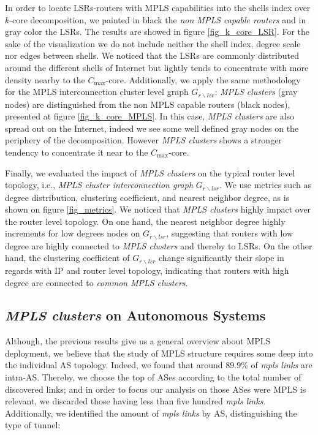 In order to locate LSRs-routers with MPLS capabilities into the shells index over $k$-core decomposition, we painted in black the \textit{non MPLS capable routers} and in gray color the LSRs. 
The results are showed in figure \ref{fig_k_core_LSR}. 
For the sake of the visualization we do not include neither the shell index, degree scale nor edges between shells. 
We noticed that the LSRs are commonly distributed around the different shells of Internet but  lightly tends to concentrate with more density nearby to the $C_{\max}$-core.
Additionally, we apply the same methodology for the MPLS interconnection cluster level graph $G_{r\backslash lsr}$: \textit{MPLS clusters} (gray nodes) are distinguished from the non MPLS capable routers (black nodes), presented at figure \ref{fig_k_core_MPLS}.
In this case,  \textit{MPLS clusters}  are also spread out on the Internet, indeed we see some well defined gray nodes on the periphery of the decomposition. However \textit{MPLS clusters} shows a stronger tendency to concentrate it near to the $C_{\max}$-core. 

Finally, we evaluated the impact of \textit{MPLS clusters} on the typical router level topology, i.e., \textit{MPLS cluster interconnection graph} $G_{r \backslash lsr }$. We use metrics such as degree distribution, clustering coefficient, and nearest neighbor degree, as is shown on figure \ref{fig_metrics}. 
We noticed that \textit{MPLS clusters} highly impact over the router level topology. 
On one hand, the nearest neighbor degree highly increments for low degrees nodes on $G_{r \backslash lsr }$, suggesting that routers with low degree are highly connected to \textit{MPLS clusters} and thereby to LSRs. 
On the other hand, the clustering coefficient of $G_{r \backslash lsr }$ change significantly their slope in regards with IP and router level topology, indicating that routers with high degree are connected to \textit{common} \textit{MPLS clusters}.


\subsection{\textit{MPLS clusters} on Autonomous Systems}\label{cluster.as}

Although, the previous results give us a general overview about MPLS deployment, we believe that the study of MPLS structure requires some deep into the individual AS topology. 
Indeed, we found that around $89.9\%$ of \textit{mpls links} are intra-AS.  
Thereby, we choose the top of ASes according to the total number of discovered links; and in order to focus our analysis on those ASes were MPLS is relevant, we discarded those having less than five hundred \textit{mpls links}. 
Additionally, we identified  the amount of \textit{mpls links} by AS, distinguishing the type of tunnel: 

